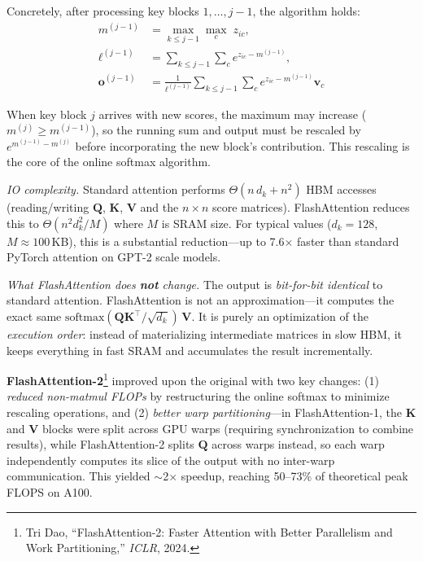 \begin{notebox}
Concretely, after processing key blocks $1, \ldots, j{-}1$, the algorithm holds:
\begin{align*}
m^{(j-1)} &= \max_{k \leq j-1} \max_c\; z_{ic}, \\
\ell^{(j-1)} &= \sum_{k \leq j-1} \sum_c e^{z_{ic} - m^{(j-1)}}, \\
\mathbf{o}^{(j-1)} &= \frac{1}{\ell^{(j-1)}} \sum_{k \leq j-1} \sum_c e^{z_{ic} - m^{(j-1)}} \mathbf{v}_c
\end{align*}

When key block $j$ arrives with new scores, the maximum may increase ($m^{(j)} \geq m^{(j-1)}$), so the running sum and output must be rescaled by $e^{m^{(j-1)} - m^{(j)}}$ before incorporating the new block's contribution. This rescaling is the core of the online softmax algorithm.

\emph{IO complexity.} Standard attention performs $\Theta(n\,d_k + n^2)$ HBM accesses (reading/writing $\mathbf{Q}$, $\mathbf{K}$, $\mathbf{V}$ and the $n \times n$ score matrices). FlashAttention reduces this to $\Theta(n^2 d_k^2/M)$ where $M$ is SRAM size. For typical values ($d_k = 128$, $M \approx 100$\,KB), this is a substantial reduction---up to 7.6$\times$ faster than standard PyTorch attention on GPT-2 scale models.

\emph{What FlashAttention does \textbf{not} change.} The output is \emph{bit-for-bit identical} to standard attention. FlashAttention is not an approximation---it computes the exact same $\text{softmax}(\mathbf{Q}\mathbf{K}^\top / \sqrt{d_k})\,\mathbf{V}$. It is purely an optimization of the \emph{execution order}: instead of materializing intermediate matrices in slow HBM, it keeps everything in fast SRAM and accumulates the result incrementally.

\textbf{FlashAttention-2}\footnote{Tri Dao, ``FlashAttention-2: Faster Attention with Better Parallelism and Work Partitioning,'' \emph{ICLR}, 2024.} improved upon the original with two key changes: (1) \emph{reduced non-matmul FLOPs} by restructuring the online softmax to minimize rescaling operations, and (2) \emph{better warp partitioning}---in FlashAttention-1, the $\mathbf{K}$ and $\mathbf{V}$ blocks were split across GPU warps (requiring synchronization to combine results), while FlashAttention-2 splits $\mathbf{Q}$ across warps instead, so each warp independently computes its slice of the output with no inter-warp communication. This yielded $\sim$2$\times$ speedup, reaching 50--73\% of theoretical peak FLOPS on A100.


\end{notebox}
